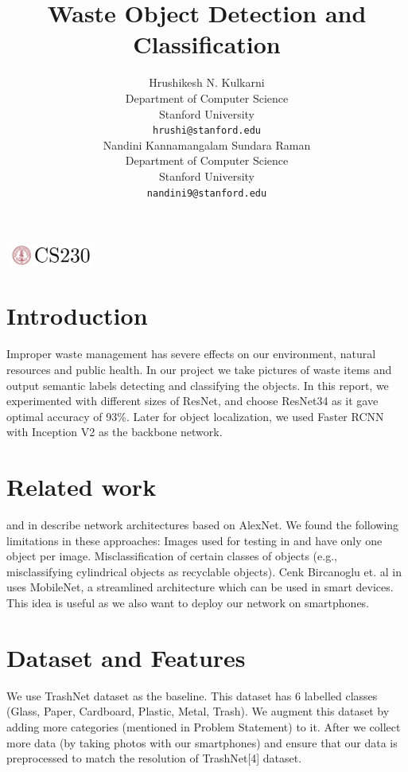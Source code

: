 \documentclass{article}
\title{Waste Object Detection and Classification}
\author{
 Hrushikesh N. Kulkarni\\
  Department of Computer Science\\
  Stanford University\\
  \texttt{hrushi@stanford.edu} \\
  \And
  Nandini Kannamangalam Sundara Raman\\
  Department of Computer Science\\
  Stanford University\\
  \texttt{nandini9@stanford.edu} \\
}
\begin{document}

\begin{center}
\includegraphics[width=3cm, height=0.7cm]{CS230}
\end{center}

\maketitle

\begin{abstract}

\end{abstract}

\section{Introduction}	
Improper waste management has severe effects on our environment, natural resources and public health. In our project we take pictures of waste items and output semantic labels detecting and classifying the objects.
In this report, we experimented with different sizes of ResNet, and choose ResNet34 as it gave optimal accuracy of 93\%. Later for object localization, we used Faster RCNN with Inception V2 as the backbone network.

\section{Related work}

\citep{yang2016classification} and \cite{chu2018multilayer} in describe network architectures based on AlexNet. We found the following limitations in these approaches: Images used for testing in \citep{yang2016classification} and \cite{chu2018multilayer} have only one object per image.  
Misclassification of certain classes of objects (e.g., misclassifying cylindrical objects as recyclable objects). 
Cenk Bircanoglu et. al in \cite{bircanouglu2018recyclenet} uses MobileNet, a streamlined architecture which can be used in smart devices. This idea is useful as we also want to deploy our network on smartphones. 



\section{Dataset and Features}
We use TrashNet \citep{yang2016classification} dataset as the baseline. This dataset has 6 labelled classes (Glass, Paper, Cardboard, Plastic, Metal, Trash). We augment this dataset by adding more categories (mentioned in Problem Statement) to it.  After we collect more data (by taking photos with our smartphones) and ensure that our data is preprocessed to match the resolution of TrashNet[4] dataset. 
\end{document}
